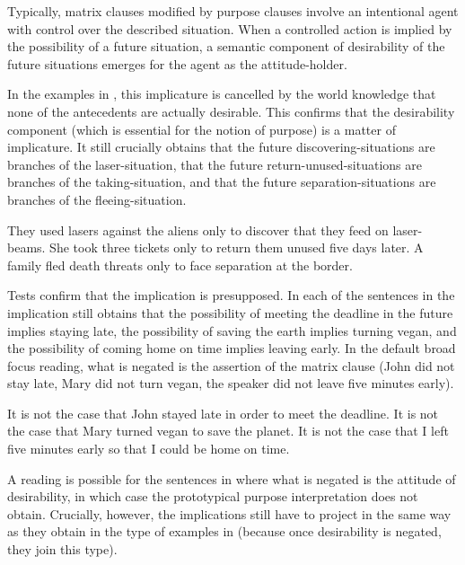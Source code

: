 \documentclass[output=paper]{langscibook}
\begin{document}
Typically, matrix clauses modified by purpose clauses involve an intentional agent with control over the described situation. When a controlled action is implied by the possibility of a future situation, a semantic component of desirability of the future situations emerges for the agent as the attitude-holder.

In the examples in , this implicature is cancelled by the world knowledge that none of the antecedents are actually desirable. This confirms that the desirability component (which is essential for the notion of purpose) is a matter of implicature. It still crucially obtains that the future discovering-situations are branches of the laser-situation, that the future return-unused-situations are branches of the taking-situation, and that the future separation-situations are branches of the fleeing-situation.

\ea\label{ex:NoPurpose}
\ea They used lasers against the aliens only to discover that they feed on laser-beams.
\ex She took three tickets only to return them unused five days later.
\ex A family fled death threats only to face separation at the border.\label{ex:NoPurpose-c}
\z\z

\noindent Tests confirm that the implication is presupposed. In each of the sentences in  the implication still obtains that the possibility of meeting the deadline in the future implies staying late, the possibility of saving the earth implies turning vegan, and the possibility of coming home on time implies leaving early. In the default broad focus reading, what is negated is the assertion of the matrix clause (John did not stay late, Mary did not turn vegan, the speaker did not leave five minutes early).

\ea\label{ex:PresupTest5}
\ea It is not the case that John stayed late in order to meet the deadline.\label{ex:PresupTest5-a}
\ex It is not the case that Mary turned vegan to save the planet.\label{ex:PresupTest5-b}
\ex It is not the case that I left five minutes early so that I could be home on time.\label{ex:PresupTest5-c}
\z\z

\noindent A reading is possible for the sentences in  where what is negated is the attitude of desirability, in which case the prototypical purpose interpretation does not obtain. Crucially, however, the implications still have to project in the same way as they obtain in the type of examples in  (because once desirability is negated, they join this type).
\end{document}
